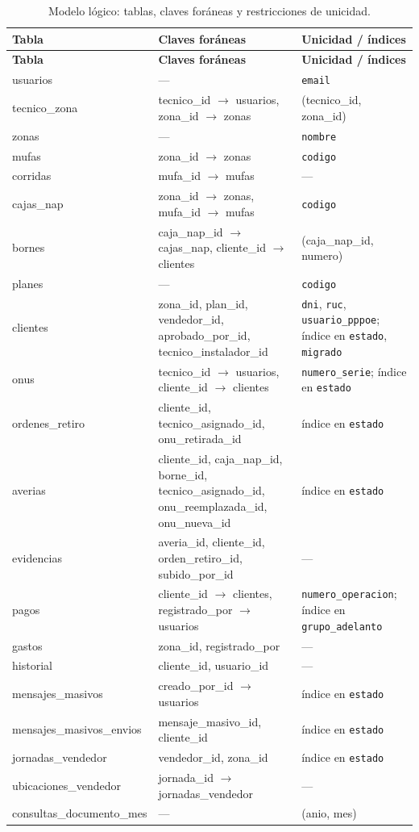 {\small
\begin{longtable}{L{3.4cm}L{5.6cm}L{5.0cm}}
\caption{Modelo lógico: tablas, claves foráneas y restricciones de unicidad.}\label{tab:ce02-logico}\\
\toprule
\textbf{Tabla} & \textbf{Claves foráneas} & \textbf{Unicidad / índices} \\
\midrule
\endfirsthead
\toprule
\textbf{Tabla} & \textbf{Claves foráneas} & \textbf{Unicidad / índices} \\
\midrule
\endhead
\bottomrule
\endlastfoot
usuarios & --- & \texttt{email} \\
tecnico\_zona & tecnico\_id $\rightarrow$ usuarios, zona\_id $\rightarrow$ zonas & (tecnico\_id, zona\_id) \\
zonas & --- & \texttt{nombre} \\
mufas & zona\_id $\rightarrow$ zonas & \texttt{codigo} \\
corridas & mufa\_id $\rightarrow$ mufas & --- \\
cajas\_nap & zona\_id $\rightarrow$ zonas, mufa\_id $\rightarrow$ mufas & \texttt{codigo} \\
bornes & caja\_nap\_id $\rightarrow$ cajas\_nap, cliente\_id $\rightarrow$ clientes & (caja\_nap\_id, numero) \\
planes & --- & \texttt{codigo} \\
clientes & zona\_id, plan\_id, vendedor\_id, aprobado\_por\_id, tecnico\_instalador\_id & \texttt{dni}, \texttt{ruc}, \texttt{usuario\_pppoe}; índice en \texttt{estado}, \texttt{migrado} \\
onus & tecnico\_id $\rightarrow$ usuarios, cliente\_id $\rightarrow$ clientes & \texttt{numero\_serie}; índice en \texttt{estado} \\
ordenes\_retiro & cliente\_id, tecnico\_asignado\_id, onu\_retirada\_id & índice en \texttt{estado} \\
averias & cliente\_id, caja\_nap\_id, borne\_id, tecnico\_asignado\_id, onu\_reemplazada\_id, onu\_nueva\_id & índice en \texttt{estado} \\
evidencias & averia\_id, cliente\_id, orden\_retiro\_id, subido\_por\_id & --- \\
pagos & cliente\_id $\rightarrow$ clientes, registrado\_por $\rightarrow$ usuarios & \texttt{numero\_operacion}; índice en \texttt{grupo\_adelanto} \\
gastos & zona\_id, registrado\_por & --- \\
historial & cliente\_id, usuario\_id & --- \\
mensajes\_masivos & creado\_por\_id $\rightarrow$ usuarios & índice en \texttt{estado} \\
mensajes\_masivos\_\allowbreak envios & mensaje\_masivo\_id, cliente\_id & índice en \texttt{estado} \\
jornadas\_vendedor & vendedor\_id, zona\_id & índice en \texttt{estado} \\
ubicaciones\_vendedor & jornada\_id $\rightarrow$ jornadas\_vendedor & --- \\
consultas\_documento\_mes & --- & (anio, mes) \\
\end{longtable}
}

